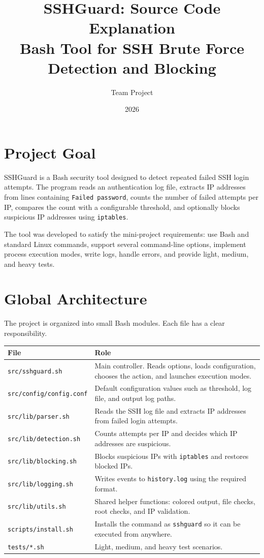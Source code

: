 \documentclass[12pt,a4paper]{article}
\title{
    \textbf{SSHGuard: Source Code Explanation}\\
    \large Bash Tool for SSH Brute Force Detection and Blocking
}
\author{Team Project}
\date{2026}
\begin{document}
\maketitle
\tableofcontents
\newpage

\section{Project Goal}

SSHGuard is a Bash security tool designed to detect repeated failed SSH login attempts.
The program reads an authentication log file, extracts IP addresses from lines containing
\texttt{Failed password}, counts the number of failed attempts per IP, compares the count
with a configurable threshold, and optionally blocks suspicious IP addresses using
\texttt{iptables}.

The tool was developed to satisfy the mini-project requirements: use Bash and standard
Linux commands, support several command-line options, implement process execution modes,
write logs, handle errors, and provide light, medium, and heavy tests.

\section{Global Architecture}

The project is organized into small Bash modules. Each file has a clear responsibility.

\begin{longtable}{|p{5cm}|p{9cm}|}
\hline
\textbf{File} & \textbf{Role} \\
\hline
\texttt{src/sshguard.sh} & Main controller. Reads options, loads configuration, chooses the action, and launches execution modes. \\
\hline
\texttt{src/config/config.conf} & Default configuration values such as threshold, log file, and output log paths. \\
\hline
\texttt{src/lib/parser.sh} & Reads the SSH log file and extracts IP addresses from failed login attempts. \\
\hline
\texttt{src/lib/detection.sh} & Counts attempts per IP and decides which IP addresses are suspicious. \\
\hline
\texttt{src/lib/blocking.sh} & Blocks suspicious IPs with \texttt{iptables} and restores blocked IPs. \\
\hline
\texttt{src/lib/logging.sh} & Writes events to \texttt{history.log} using the required format. \\
\hline
\texttt{src/lib/utils.sh} & Shared helper functions: colored output, file checks, root checks, and IP validation. \\
\hline
\texttt{scripts/install.sh} & Installs the command as \texttt{sshguard} so it can be executed from anywhere. \\
\hline
\texttt{tests/*.sh} & Light, medium, and heavy test scenarios. \\
\hline
\end{longtable}
\end{document}
